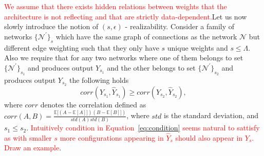 \documentclass[twoside]{article}
\begin{document}
\textcolor{red}{We assume that there exists hidden relations between weights that the architecture is not reflecting and that are strictly data-dependent.}Let us now slowly introduce the notion of $(s,\epsilon)$ - realizability. Consider a family of networks $\{\mathcal{N}^{'}\}_s$ which have the same graph of connections as the network $\mathcal{N}$ but different edge weighting such that they only have $s$ unique weights and $s \leq \Lambda$. Also we require that for any two networks where one of them belongs to set $\{\mathcal{N}^{'}\}_{s_1}$ and produces output $Y_{s_1}$ and the other belongs to set $\{\mathcal{N}^{'}\}_{s_2}$ and produces output $Y_{s_2}$ the following holds
\begin{equation}
corr(Y_{s_1},\hat{Y}_{s_1}) \geq corr(Y_{s_2},\hat{Y}_{s_2}),
\label{eq:condition}
\end{equation}
where $corr$ denotes the correlation defined as $corr(A,B) = \frac{\mathbb{E}[(A - \mathbb{E}[A]])(B - \mathbb{E}[B]])}{std(A)std(B)}$, where $std$ is the standard deviation, and $s_1 \leq s_2$. \textcolor{red}{Intuitively condition in Equation~\ref{eq:condition} seems natural to sattisfy as with smaller $s$ more configurations appearing in $\hat{Y}_s$ should also appear in $Y_s$. Draw an example}. 
\end{document}
